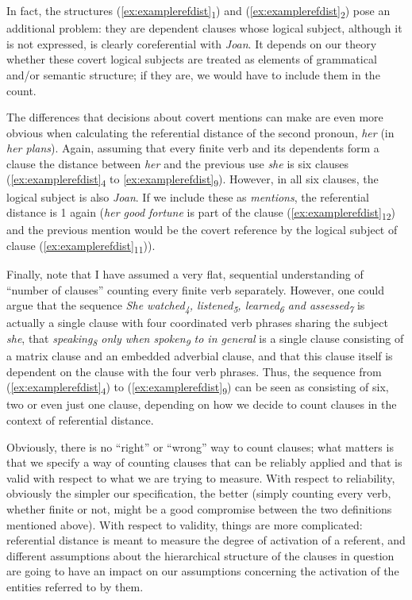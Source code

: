 In fact, the structures (\ref{ex:examplerefdist}\textsubscript{1}) and (\ref{ex:examplerefdist}\textsubscript{2}) pose an additional problem: they are dependent clauses whose logical subject, although it is not expressed, is clearly coreferential with \textit{Joan}. It depends on our theory whether these covert logical subjects are treated as elements of grammatical and\slash or semantic  structure; if they are, we would have to include them in the count.

The differences that decisions about covert mentions can make are even more obvious when calculating the referential distance  of the second pronoun,  \textit{her} (in \textit{her plans}). Again, assuming that every finite verb  and its dependents form a clause the distance between \textit{her} and the previous use \textit{she} is six clauses (\ref{ex:examplerefdist}\textsubscript{4} to \ref{ex:examplerefdist}\textsubscript{9}). However, in all six clauses, the logical subject is also \textit{Joan}. If we include these as \textit{mentions}, the referential distance  is 1 again (\textit{her good fortune} is part of the clause (\ref{ex:examplerefdist}\textsubscript{12}) and the previous mention would be the covert reference by the logical subject of clause (\ref{ex:examplerefdist}\textsubscript{11})).

Finally, note that I have assumed a very flat, sequential understanding of ``number of clauses'' counting every finite verb  separately. However, one could argue that the sequence \textit{She watched\textsubscript{4}, listened\textsubscript{5}, learned\textsubscript{6} and assessed\textsubscript{7}} is actually a single clause with four coordinated  verb phrases sharing the subject \textit{she}, that \textit{speaking\textsubscript{8} only when spoken\textsubscript{9} to in general} is a single clause consisting of a matrix clause and an embedded adverbial  clause, and that this clause itself is dependent on the clause with the four verb  phrases. Thus, the sequence from (\ref{ex:examplerefdist}\textsubscript{4}) to (\ref{ex:examplerefdist}\textsubscript{9}) can be seen as consisting of six, two or even just one clause, depending on how we decide to count clauses in the context of referential  distance.

Obviously, there is no ``right'' or ``wrong'' way to count clauses; what matters is that we specify a way of counting clauses that can be reliably  applied and that is valid  with respect to what we are trying to measure.  With respect to reliability, obviously the simpler our specification, the better (simply counting every verb,  whether finite or not, might be a good compromise between the two definitions mentioned above). With respect to validity, things are more complicated: referential distance  is meant to measure  the degree of activation of a referent, and different assumptions about the hierarchical structure of the clauses in question are going to have an impact on our assumptions concerning the activation of the entities referred to by them.

